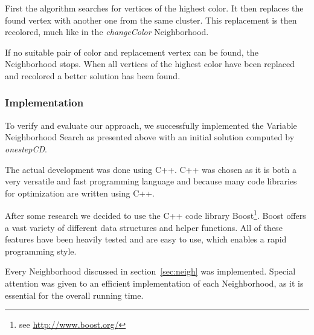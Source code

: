 \documentclass[paper=a4,fontsize=12pt]{scrartcl}
\begin{document}
First the algorithm searches for vertices of the highest color. It then replaces the found vertex with another one from the same cluster. This replacement is then recolored, much like in the \emph{changeColor} Neighborhood. 

If no suitable pair of color and replacement vertex can be found, the Neighborhood stops. When all vertices of the highest color have been replaced and recolored a better solution has been found. 

\subsubsection{Implementation}
To verify and evaluate our approach, we successfully implemented the Variable Neighborhood Search as presented above with an initial solution computed by \emph{onestepCD}. 

The actual development was done using C++. C++ was chosen as it is both a very versatile and fast programming language and because many code libraries for optimization are written using C++.



After some research we decided to use the C++ code library Boost\footnote{see \url{http://www.boost.org/}}. Boost offers a vast variety of different data structures and helper functions. All of these features have been heavily tested and are easy to use, which enables a rapid programming style.


Every Neighborhood discussed in section~\ref{sec:neigh} was implemented. Special attention was given to an efficient implementation of each Neighborhood, as it is essential for the overall running time.
\end{document}
